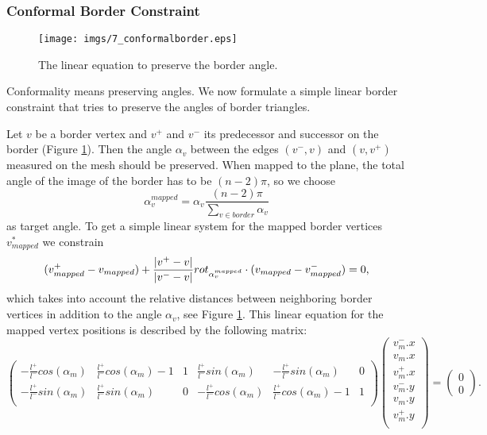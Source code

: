 \subsubsection*{Conformal Border Constraint}

\begin{figure}%
\begin{center}
\texttt{[image: imgs/7\_conformalborder.eps]}%
\end{center}

\caption{The linear equation to preserve the border angle.}%
\label{fig:6_conformalBorder}%
\end{figure}
Conformality means preserving angles. We now formulate a simple linear border constraint that tries to preserve the angles of border triangles. 

Let $v$ be a border vertex and $v^+$ and $v^-$ its predecessor and successor on the border (Figure \ref{fig:6_conformalBorder}). Then the angle $\alpha_v$ between the edges $(v^-,v)$ and $(v,v^+)$ measured on the mesh
should be preserved. When mapped to the plane, the total angle of the image of the border has to be $(n-2)\pi$, so we choose
\begin{equation}\alpha_v^{mapped} = \alpha_v \frac{(n-2) \pi}{\sum_{v \in border} \alpha_v}\label{eq:conformalAngles}\end{equation}
as target angle. To get a simple linear system for the mapped border vertices $v_{mapped}^*$ we constrain
\begin{equation} (v^+_{mapped}-v_{mapped} ) + \frac{\left| v^+-v \right|}{\left| v^- -v \right|}rot_{\alpha_v^{mapped}} \cdot (v_{mapped} - v_{mapped}^- )= 0,\label{eq:conformalBorder}\end{equation}
which takes into account the relative distances between neighboring border vertices in addition to the angle $\alpha_v$, see Figure \ref{fig:6_conformalBorder}. This linear equation for the mapped vertex positions is described by the following matrix:
\[\begin{pmatrix}
-\frac{l^+}{l^-}cos(\alpha_{m})& \frac{l^+}{l^-}cos(\alpha_{m}) -1 & 1 & \frac{l^+}{l^-}sin(\alpha_{m}) & -\frac{l^+}{l^-}sin(\alpha_{m}) & 0\\
-\frac{l^+}{l^-}sin(\alpha_{m}) & \frac{l^+}{l^-}sin(\alpha_{m})  & 0  & - \frac{l^+}{l^-}cos(\alpha_{m}) & \frac{l^+}{l^-}cos(\alpha_{m}) -1 & 1\\
 
\end{pmatrix} \begin{pmatrix}
v_{m}^-.x \\
v_{m}.x \\
v_{m}^+.x \\
v_{m}^-.y \\
v_{m}.y \\
v_{m}^+.y \\
\end{pmatrix} = \begin{pmatrix}
0 \\
0
\end{pmatrix}.\]

